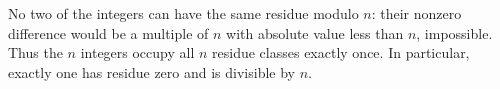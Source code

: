 No two of the integers can have the same residue modulo $n$: their nonzero difference would be a multiple of $n$ with absolute value less than $n$, impossible. Thus the $n$ integers occupy all $n$ residue classes exactly once. In particular, exactly one has residue zero and is divisible by $n$.
